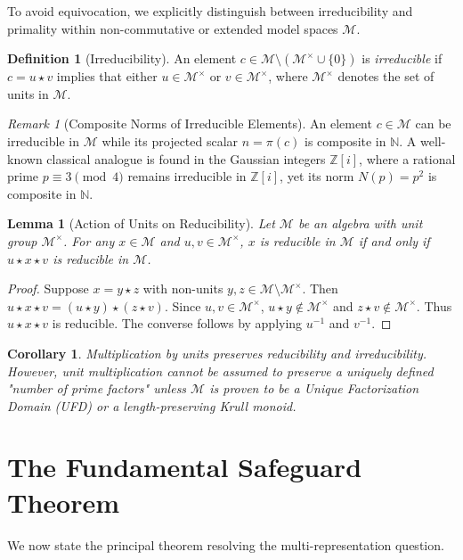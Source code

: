 \documentclass[11pt,a4paper,reqno]{amsart}
\newtheorem{lemma}[theorem]{Lemma}
\newtheorem{corollary}[theorem]{Corollary}
\theoremstyle{definition}
\newtheorem{definition}[theorem]{Definition}
\theoremstyle{remark}
\newtheorem{remark}[theorem]{Remark}
\newcommand{\M}{\mathcal{M}}
\newcommand{\N}{\mathbb{N}}
\newcommand{\Z}{\mathbb{Z}}
\begin{document}
	To avoid equivocation, we explicitly distinguish between irreducibility and primality within non-commutative or extended model spaces $\M$.
	
	\begin{definition}[Irreducibility]
		An element $c \in \M \setminus (\M^\times \cup \{0\})$ is \emph{irreducible} if $c = u \star v$ implies that either $u \in \M^\times$ or $v \in \M^\times$, where $\M^\times$ denotes the set of units in $\M$.
	\end{definition}
	
	\begin{remark}[Composite Norms of Irreducible Elements]
		An element $c \in \M$ can be irreducible in $\M$ while its projected scalar $n = \pi(c)$ is composite in $\N$. 
		A well-known classical analogue is found in the Gaussian integers $\Z[i]$, where a rational prime $p \equiv 3 \pmod 4$ remains irreducible in $\Z[i]$, yet its norm $N(p) = p^2$ is composite in $\N$.
	\end{remark}
	
	\begin{lemma}[Action of Units on Reducibility]
		Let $\M$ be an algebra with unit group $\M^\times$. For any $x \in \M$ and $u, v \in \M^\times$, $x$ is reducible in $\M$ if and only if $u \star x \star v$ is reducible in $\M$.
	\end{lemma}
	
	\begin{proof}
		Suppose $x = y \star z$ with non-units $y, z \in \M \setminus \M^\times$. Then $u \star x \star v = (u \star y) \star (z \star v)$. Since $u, v \in \M^\times$, $u \star y \notin \M^\times$ and $z \star v \notin \M^\times$. Thus $u \star x \star v$ is reducible. The converse follows by applying $u^{-1}$ and $v^{-1}$.
	\end{proof}
	
	\begin{corollary}
		Multiplication by units preserves reducibility and irreducibility. However, unit multiplication cannot be assumed to preserve a uniquely defined "number of prime factors" unless $\M$ is proven to be a Unique Factorization Domain (UFD) or a length-preserving Krull monoid.
	\end{corollary}
	
	\section{The Fundamental Safeguard Theorem}
	
	We now state the principal theorem resolving the multi-representation question.
	
\end{document}
